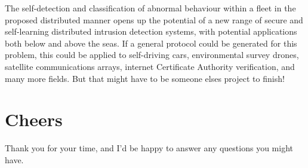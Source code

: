 \documentclass[oneside,11pt,a4paper]{Latex/Classes/PhDthesisPSnPDF}
\begin{document}
\begin{doublespace}
The self-detection and classification of abnormal behaviour within a fleet in
the proposed distributed manner opens up the potential of a new range of secure
and self-learning distributed intrusion detection systems, with potential
applications both below and above the seas. If a general protocol could be
generated for this problem, this could be applied to self-driving cars,
environmental survey drones, satellite communications arrays,
internet Certificate Authority verification, and many more fields. But that
might have to be someone elses project to finish!

\section{Cheers}  Thank you for your time, and I'd be happy to answer any questions
you might have.
\end{doublespace}
\end{document}

